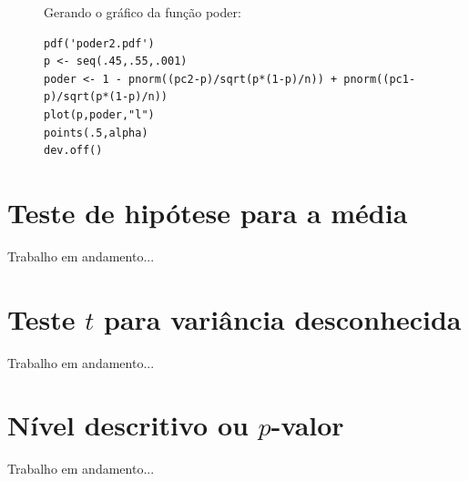 \documentclass[12pt,a4paper]{article}
\theoremstyle{plain}
\theoremstyle{definition}
\theoremstyle{remark}
\begin{document}
\begin{figure}[H]
Gerando o gráfico da função poder:
\footnotesize
\begin{verbatim}
pdf('poder2.pdf')
p <- seq(.45,.55,.001)
poder <- 1 - pnorm((pc2-p)/sqrt(p*(1-p)/n)) + pnorm((pc1-p)/sqrt(p*(1-p)/n))
plot(p,poder,"l")
points(.5,alpha)
dev.off()
\end{verbatim}
\end{figure}

\section{Teste de hipótese para a média}

Trabalho em andamento...

\section{Teste $t$ para variância desconhecida}

Trabalho em andamento...

\section{Nível descritivo ou $p$-valor}

Trabalho em andamento...
\end{document}
